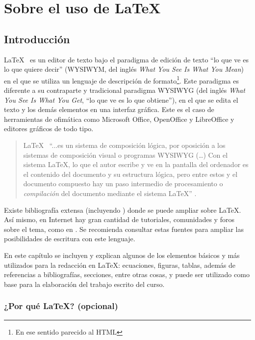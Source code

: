   \chapter{Sobre el uso de \LaTeX}
\label{C:sobre_LaTeX}

\section{Introducción}

\LaTeX~ es un editor de texto bajo el paradigma de edición de texto ``lo que ve es lo que quiere decir'' (WYSIWYM, del inglés \emph{What You See Is What You Mean}) en el que se utiliza un lenguaje de descripción de formato\footnote{En ese sentido parecido al HTML}. Este paradigma es diferente a su contraparte y tradicional paradigma WYSIWYG (del inglés \emph{What You See Is What You Get}, ``lo que ve es lo que obtiene''), en el que se edita el texto y los demás elementos en una interfaz gráfica. Este es el caso de herramientas de ofimática como Microsoft Office, OpenOffice y LibreOffice y editores gráficos de todo tipo.

\begin{quote}
\LaTeX~ ``...es un sistema de composición lógica, por oposición a los sistemas de composición visual o programas WYSIWYG (\ldots) Con el sistema \LaTeX, lo que el autor escribe y ve en la pantalla del ordenador es el contenido del documento y su estructura lógica, pero entre estos y el documento compuesto hay un paso intermedio de procesamiento o \emph{compilación} del documento mediante el sistema \LaTeX'' \cite{Valiente2001}.
\end{quote}

Existe bibliografía extensa (incluyendo \cite{Valiente2001}\cite{Gratzer2001}\cite{Krishnan2003}\cite{Oetiker2014}\cite{Wikibooks2016}) donde se puede ampliar sobre \LaTeX. Así mismo, en Internet hay gran cantidad de tutoriales, comunidades y foros sobre el tema, como en \cite{StackExchange2016}. Se recomienda consultar estas fuentes para ampliar las posibilidades de escritura con este lenguaje.

En este capítulo se incluyen y explican algunos de los elementos básicos y más utilizados para la redacción en \LaTeX: ecuaciones, figuras, tablas, además de referencias a bibliografías, secciones, entre otras cosas, y puede ser utilizado como base para la elaboración del trabajo escrito del curso.

\subsection{¿Por qué \LaTeX? (opcional)}

